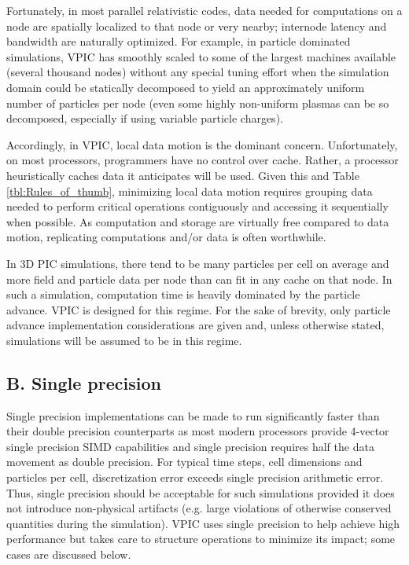 \documentclass[aps,prl,preprint,preprintnumbers,groupedaddress]{revtex4}
\newcommand{\tbl}[1]{Table \ref{tbl:#1}}
\begin{document}
Fortunately, in most parallel relativistic codes, data needed for
computations on a node are spatially localized to that node or very
nearby; internode latency and bandwidth are naturally optimized.  For
example, in particle dominated simulations, VPIC has smoothly scaled
to some of the largest machines available (several thousand nodes)
without any special tuning effort when the simulation domain could be
statically decomposed to yield an approximately uniform number of
particles per node (even some highly non-uniform plasmas can be so
decomposed, especially if using variable particle charges).

Accordingly, in VPIC, local data motion is the dominant concern.
Unfortunately, on most processors, programmers have no control over
cache.  Rather, a processor heuristically caches data it anticipates
will be used.  Given this and \tbl{Rules_of_thumb}, minimizing local
data motion requires grouping data needed to perform critical
operations contiguously and accessing it sequentially when possible.
As computation and storage are virtually free compared to data motion,
replicating computations and/or data is often worthwhile.

In 3D PIC simulations, there tend to be many particles per cell on
average and more field and particle data per node than can fit in any
cache on that node.  In such a simulation, computation time is heavily
dominated by the particle advance.  VPIC is designed for this regime.
For the sake of brevity, only particle advance implementation
considerations are given and, unless otherwise stated, simulations
will be assumed to be in this regime.

\subsection{B. Single precision}

Single precision implementations can be made to run significantly
faster than their double precision counterparts as most modern
processors provide 4-vector single precision SIMD capabilities and
single precision requires half the data movement as double precision.
For typical time steps, cell dimensions and particles per cell,
discretization error exceeds single precision arithmetic error.  Thus,
single precision should be acceptable for such simulations provided it
does not introduce non-physical artifacts (e.g. large violations of
otherwise conserved quantities during the simulation).  VPIC uses
single precision to help achieve high performance but takes care to
structure operations to minimize its impact; some cases are discussed
below.
\end{document}
